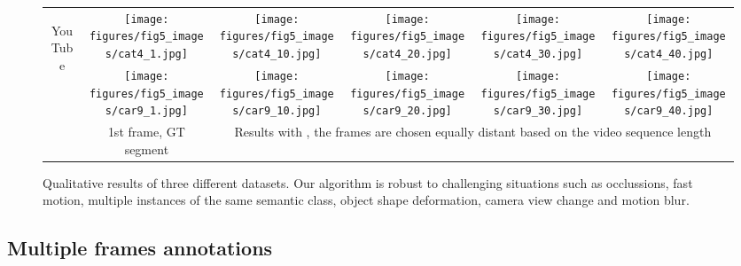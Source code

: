 \documentclass[10pt,twocolumn,letterpaper]{article}
\begin{document}
\begin{figure*}
\begin{centering}
\begin{tabular}{cccccc}
 \multirow{2}{*}{\begin{turn}{90}
{\footnotesize{}YouTube}
\end{turn}} &
\texttt{[image: figures/fig5\_images/cat4\_1.jpg]} &
\texttt{[image: figures/fig5\_images/cat4\_10.jpg]} &
\texttt{[image: figures/fig5\_images/cat4\_20.jpg]} &
\texttt{[image: figures/fig5\_images/cat4\_30.jpg]} &
\texttt{[image: figures/fig5\_images/cat4\_40.jpg]} \tabularnewline
   &
\texttt{[image: figures/fig5\_images/car9\_1.jpg]} &
\texttt{[image: figures/fig5\_images/car9\_10.jpg]} &
\texttt{[image: figures/fig5\_images/car9\_20.jpg]} &
\texttt{[image: figures/fig5\_images/car9\_30.jpg]} &
\texttt{[image: figures/fig5\_images/car9\_40.jpg]} \tabularnewline
&\footnotesize{}1st frame, GT segment & \multicolumn{4}{c}{\footnotesize{} Results with , the frames are chosen equally distant based on the video sequence length}
\end{tabular}
\par\end{centering}
\caption{\label{fig:qualitative-results}
Qualitative results of three different datasets. Our algorithm is robust to challenging situations such as occlussions, fast motion, multiple instances of the same semantic class,
object shape deformation, camera view change and motion blur.}
\end{figure*}
 


\subsection{Multiple frames annotations}
\label{sec:few-frames-results}
\end{document}
